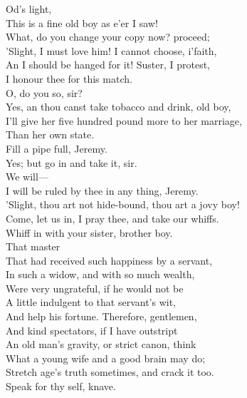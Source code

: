 \documentclass[a4paper,oneside,12pt]{memoir}
\begin{document}
\begin{drama*}
\kastrilspeaks {} Od's light,\\
This is a fine old boy as e'er I saw!\\
\lovewitspeaks What, do you change your copy now? proceed;\\
\kastrilspeaks 'Slight, I must love him! I cannot choose, i'faith,\\
An I should be hanged for it! Suster, I protest,\\
I honour thee for this match.\\
\lovewitspeaks {} O, do you so, sir?\\
\kastrilspeaks Yes, an thou canst take tobacco and drink, old boy,\\
I'll give her five hundred pound more to her marriage,\\
Than her own state.\\
\lovewitspeaks {} Fill a pipe full, Jeremy.\\
\facespeaks Yes; but go in and take it, sir.\\
\lovewitspeaks {} We will---\\
I will be ruled by thee in any thing, Jeremy.\\
\kastrilspeaks 'Slight, thou art not hide-bound, thou art a jovy boy!\\
Come, let us in, I pray thee, and take our whiffs.\\
\lovewitspeaks Whiff in with your sister, brother boy.\\
 That master\\
That had received such happiness by a servant,\\
In such a widow, and with so much wealth,\\
Were very ungrateful, if he would not be\\
A little indulgent to that servant's wit,\\
And help his fortune. Therefore, gentlemen,\\
And kind spectators, if I have outstript\\
An old man's gravity, or strict canon, think\\
What a young wife and a good brain may do;\\
Stretch age's truth sometimes, and crack it too.\\
Speak for thy self, knave.\\

\end{drama*}
\end{document}
